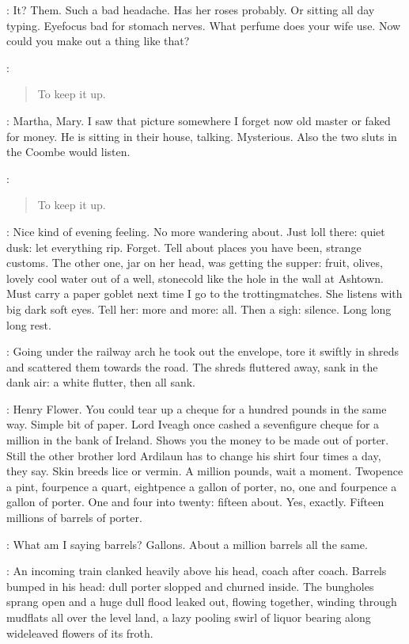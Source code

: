\BloomInt:
It?
Them.
Such a bad headache.
Has her roses probably.
Or sitting all day typing.
Eyefocus bad for stomach nerves.
What perfume does your wife use.
Now could you make out a thing like that?

\sluts:
\begin{verse}
    To keep it up.
\end{verse}

\BloomInt:
Martha, Mary.
I saw that picture somewhere I forget now
old master or faked for money.
He is sitting in their house, talking.
Mysterious.
Also the two sluts in the Coombe would listen.

\sluts:
\begin{verse}
    To keep it up.
\end{verse}

\BloomInt:
Nice kind of evening feeling.
No more wandering about.
Just loll there:
quiet dusk:
let everything rip.
Forget.
Tell about places you have been,
strange customs.
The other one,
jar on her head,
was getting the supper:
fruit, olives,
lovely cool water out of a well,
stonecold like the hole in the wall at Ashtown.
Must carry a paper goblet next time I go to the trottingmatches.
She listens with big dark soft eyes.
Tell her:
more and more:
all.
Then a sigh:
silence.
Long long long rest.

:
Going under the railway arch
he took out the envelope,
tore it swiftly in shreds
and scattered them towards the road.
The shreds fluttered away,
sank in the dank air:
a white flutter, then all sank.

\BloomInt:
Henry Flower.
You could tear up a cheque for a hundred pounds in the same way.
Simple bit of paper.
Lord Iveagh once cashed a sevenfigure cheque for a million in the bank of Ireland.
Shows you the money to be made out of porter.
Still the other brother
lord Ardilaun
has to change his shirt four times a day,
they say.
Skin breeds lice or vermin.
A million pounds, wait a moment.
Twopence a pint,
fourpence a quart,
eightpence a gallon of porter,
no, one and fourpence a gallon of porter.
One and four into twenty:
fifteen about.
Yes, exactly.
Fifteen millions of barrels of porter.

\BloomInt:
What am I saying barrels?
Gallons.
About a million barrels all the same.

:
An incoming train clanked heavily above his head, coach after coach.
Barrels bumped in his head:
dull porter slopped and churned inside.
The bungholes sprang open and a huge dull flood leaked out,
flowing together,
winding through mudflats all over the level land,
a lazy pooling swirl of liquor
bearing along wideleaved flowers of its froth.
